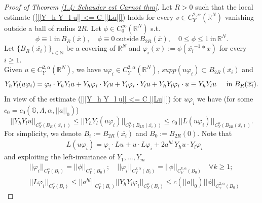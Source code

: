 \documentclass{article}
\numberwithin{equation}{section}
\begin{document}
\begin{proof}[Proof of Theorem \ref{1.4: Schauder est Carnot thm}]
    Let $R>0$ such that the local estimate (\ref{||Y_h Y_l u|| <= C ||Lu||}) holds for every $v \in C^{2,\alpha}_Y(\mathbb{R}^N)$ vanishing outside a ball of radius $2R$. Let $\phi \in C^{\infty}_0(\mathbb{R}^N)$ s.t.
    \begin{equation*}
        \phi \equiv 1 \: \text{in} \, B_R(\overline{x}), \quad \phi \equiv 0 \: \text{outside} \, B_{2R}(\overline{x}), \quad 0 \leq \phi \leq 1 \: \text{in} \, \mathbb{R}^N.
    \end{equation*}
    Let $\{B_R(\overline{x_i})\}_{i \in \mathbb{N}}$ be a covering of $\mathbb{R}^N$ and $\varphi_i(x):=\phi(\overline{x_i}^{-1} * x)$ for every $i \geq 1$. \\Given $u \in C^{2,\alpha}_Y(\mathbb{R}^N)$, we have $u \varphi_i \in C^{2,\alpha}_Y(\mathbb{R}^N)$, $supp(u \varphi_i) \subset B_{2R}(\overline{x_i})$ and
    \begin{equation*}
        Y_h Y_l(u \varphi_i)= \varphi_i \cdot Y_h Y_l u + Y_h \varphi_i \cdot Y_l u + Y_l \varphi_i \cdot Y_l u + Y_h Y_l \varphi_i \cdot u \equiv Y_h Y_l u \hspace{5mm} \text{in } B_R(\overline{x_i}).
    \end{equation*}
    In view of the estimate (\ref{||Y_h Y_l u|| <= C ||Lu||}) for $u \varphi_i$ we have (for some $c_0=c_0(\mathbb{G}, \Lambda, \alpha, ||a||_0)$)
    \begin{equation}
    \label{intermediate est Hölder}
        ||Y_h Y_l u||_{C^{\alpha}_Y(B_R(\, \overline{x_i}))} \leq  ||Y_h Y_l (u \varphi_i)||_{C^{\alpha}_Y(B_{2R}(\overline{x_i}))} \leq c_0 \, ||L(u \varphi_i)||_{C^{\alpha}_Y(B_{2R}(\overline{x_i}))}.
    \end{equation}
    For simplicity, we denote $B_i:=B_{2R}(\overline{x_i})$ and $B_0:=B_{2R}(0)$. Note that 
    \begin{align*}
        & L(u \varphi_i) = \varphi_i \cdot Lu + u \cdot L\varphi_i + 2 a^{hl} \, Y_h u \cdot Y_l \varphi_i
    \end{align*}
    and exploiting the left-invariance of $Y_1,...,Y_m$
    \begin{align*}
        & ||\varphi_i||_{C^{\alpha}_Y(B_i)}=||\phi||_{C^{\alpha}_Y(B_0)}; \quad ||\varphi_i||_{C^{k,\alpha}_Y(B_i)} = ||\phi||_{C^{k,\alpha}_Y(B_0)} \quad \forall k \geq 1; \\
        & ||L \varphi_i||_{C^{\alpha}_Y(B_i)} \leq ||a^{hl}||_{C^{\alpha}_Y(B_i)} ||Y_h Y_l \varphi_i||_{C^{\alpha}_Y(B_i)} \leq c(||a||_0) ||\phi||_{C^{2,\alpha}_Y(B_0)}

\end{align*}
\end{proof}
\end{document}
